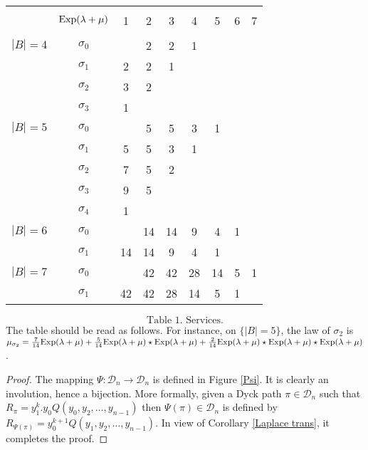 \documentclass[11pt,a4paper]{article}
\numberwithin{equation}{section}
\newcommand{\mrm}[1]{\text{\rm #1}}
\newcommand{\D}{\mathcal{D}}
\newcommand{\1}{\mathbbm{1}}
\begin{document}
\begin{center}
\begin{tabular}{|c|c|c|c|c|c|c|c|c|}
\hline
&&&&&&&& \\
&$\mrm{Exp}(\lambda+\mu) $& 1 & 2 & 3 & 4 & 5 & 6 & 7  \\
&&&&&&&& \\ \hline
 $|B|=4$ &$\sigma_0$ & & 2 & 2 & 1 & & & \\
 &$\sigma_1$ & 2 & 2 & 1 & & &&  \\
 &$\sigma_2$ & 3 & 2 & & & &&  \\
  &$\sigma_3$ & 1 & & & & & & \\ \hline
 $|B|=5$ &$\sigma_0$ & & 5 & 5 & 3 & 1 &&  \\
 &$\sigma_1$ & 5 & 5 & 3 & 1 & &&  \\
 &$\sigma_2$ &7 &5 &2 & & && \\
 &$\sigma_3$ &9 &5 & & & & & \\
& $\sigma_4$ & 1 & & & & && \\ \hline
  $|B|=6$ &$\sigma_0$ & &14  &14  &9  &4  &1& \\
 &$\sigma_1$ &14  &14  &9  &4  &1 &&  \\ \hline
  $|B|=7$ &$\sigma_0$ & & 42 & 42 & 28 & 14 &5 &1  \\
 &$\sigma_1$ & 42 & 42 & 28& 14 &5 &1 &  \\  \hline
  \end{tabular}
$$\mbox{Table 1. Services.}$$
The table should be read as follows. For instance, on $\{|B|=5\}$, the law of $\sigma_2$ is $\mu_{\sigma_2}=\frac{7}{14} \mrm{Exp}(\lambda+\mu)+\frac{5}{14}\mrm{Exp}(\lambda+\mu)\star\mrm{Exp}(\lambda+\mu)
+\frac{2}{14}\mrm{Exp}(\lambda+\mu)\star\mrm{Exp}(\lambda+\mu)\star\mrm{Exp}(\lambda+\mu)$.
\end{center}

\begin{proof}
The mapping $\Psi : \D_n \longrightarrow \D_n$ is defined in Figure
\ref{Psi}. It is clearly an involution, hence a bijection.
More formally, given a Dyck path $\pi \in \D_n$ such that
$R_{\pi}=y_1^k.y_0Q(y_0,y_2,\dots,y_{n-1})$ then $\Psi(\pi)\in \D_n$ is
defined by $R_{\Psi(\pi)}=y_0^{k+1}Q(y_1,y_2,\dots,y_{n-1})$. In view
of Corollary \ref{Laplace trans}, it completes the proof.
\end{proof}
\end{document}
